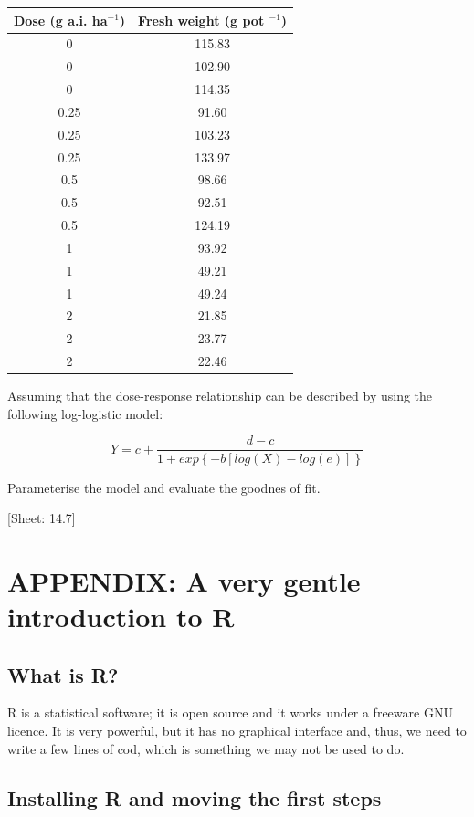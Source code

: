\documentclass[a4paper,12pt,oneside]{book}
\begin{document}
\begin{longtable}[]{@{}cc@{}}
\toprule()
Dose (g a.i. ha\(^{-1}\)) & Fresh weight (g pot \(^{-1}\)) \\
\midrule()
\endhead
0 & 115.83 \\
0 & 102.90 \\
0 & 114.35 \\
0.25 & 91.60 \\
0.25 & 103.23 \\
0.25 & 133.97 \\
0.5 & 98.66 \\
0.5 & 92.51 \\
0.5 & 124.19 \\
1 & 93.92 \\
1 & 49.21 \\
1 & 49.24 \\
2 & 21.85 \\
2 & 23.77 \\
2 & 22.46 \\
\bottomrule()
\end{longtable}

Assuming that the dose-response relationship can be described by using the following log-logistic model:

\[Y = c + \frac{d - c}{1 + exp \left\{ - b \left[ log (X) - log (e) \right] \right\}}\]

Parameterise the model and evaluate the goodnes of fit.

{[}Sheet: 14.7{]}

\hypertarget{appendix-a-very-gentle-introduction-to-r}{%
\chapter{APPENDIX: A very gentle introduction to R}\label{appendix-a-very-gentle-introduction-to-r}}

\hypertarget{what-is-r}{%
\section{What is R?}\label{what-is-r}}

R is a statistical software; it is open source and it works under a freeware GNU licence. It is very powerful, but it has no graphical interface and, thus, we need to write a few lines of cod, which is something we may not be used to do.

\hypertarget{installing-r-and-moving-the-first-steps}{%
\section{Installing R and moving the first steps}\label{installing-r-and-moving-the-first-steps}}
\end{document}
